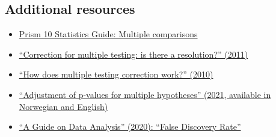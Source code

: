 \documentclass[letterpaper, 12pt]{article}
\begin{document}
\subsection*{Additional resources}

\begin{itemize}
    \setlength\itemsep{-0.5em}
     \item \href{https://www.graphpad.com/guides/prism/latest/statistics/stat_multiple_comparisons2.htm}{Prism 10 Statistics Guide: Multiple comparisons}
    \item \href{https://doi.org/10.1378/chest.11-0523}{``Correction for multiple testing: is there a resolution?'' (2011)}
    \item \href{https://doi.org/10.1038/nbt1209-1135}{``How does multiple testing correction work?'' (2010)}
    \item \href{https://doi.org/10.4045/tidsskr.21.0357}{``Adjustment of p-values for multiple hypotheses'' (2021, available in Norwegian and English)}
    \item \href{https://bookdown.org/mike/data_analysis/sec-false-discovery-rate.html}{``A Guide on Data Analysis'' (2020): ``False Discovery Rate''}
\end{itemize}
\end{document}
